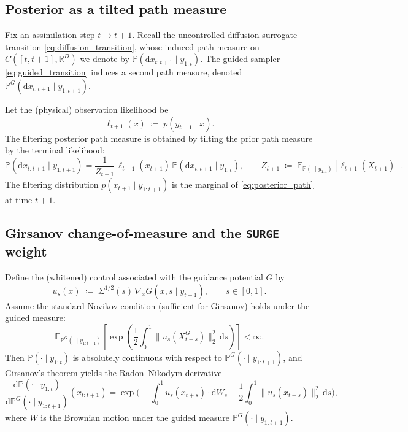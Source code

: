 \documentclass{article}
\newcommand{\E}{\mathbb{E}}
\newcommand{\dif}{{\mathrm{d}}}
\renewcommand{\P}{{\mathbb{P}}}
\newcommand{\R}{{\mathbb{R}}}
\theoremstyle{plain}
\theoremstyle{definition}
\theoremstyle{remark}
\begin{document}
\subsection{Posterior as a tilted path measure}

Fix an assimilation step $t\to t+1$. Recall the uncontrolled diffusion surrogate transition
\eqref{eq:diffusion_transition}, whose induced path measure on $C([t,t+1],\R^D)$ we denote by
$\P(\dif x_{t:t+1}\mid y_{1:t})$. The guided sampler \eqref{eq:guided_transition} induces a second path
measure, denoted $\P^G(\dif x_{t:t+1}\mid y_{1:t+1})$.

Let the (physical) observation likelihood be
\[
\ell_{t+1}(x)\;\coloneqq\;p(y_{t+1}\mid x).
\]
The filtering posterior path measure is obtained by tilting the prior path measure by the terminal
likelihood:
\begin{equation}
\label{eq:posterior_path}
\P(\dif x_{t:t+1}\mid y_{1:t+1})
=
\frac{1}{Z_{t+1}}\,
\ell_{t+1}(x_{t+1})\,
\P(\dif x_{t:t+1}\mid y_{1:t}),
\qquad
Z_{t+1}\;\coloneqq\;\E_{\P(\cdot\mid y_{1:t})}\!\left[\ell_{t+1}(X_{t+1})\right].
\end{equation}
The filtering distribution $p(x_{t+1}\mid y_{1:t+1})$ is the marginal of \eqref{eq:posterior_path} at time $t+1$.

\subsection{Girsanov change-of-measure and the \texttt{SURGE} weight}

Define the (whitened) control associated with the guidance potential $G$ by
\[
u_s(x)\;\coloneqq\;\Sigma^{1/2}(s)\,\nabla_x G(x, s\mid y_{t+1}),\qquad s\in[0,1].
\]
Assume the standard Novikov condition (sufficient for Girsanov) holds under the guided measure:
\begin{equation}
\label{eq:novikov}
\E_{\P^G(\cdot\mid y_{1:t+1})}\!\left[\exp\!\left(\frac12\int_0^1\|u_s(X_{t+s}^G)\|_2^2\,\dif s\right)\right] < \infty.
\end{equation}
Then $\P(\cdot\mid y_{1:t})$ is absolutely continuous with respect to $\P^G(\cdot\mid y_{1:t+1})$, and
Girsanov's theorem yields the Radon--Nikodym derivative
\begin{equation}
\label{eq:girsanov_rn}
\frac{\dif \P(\cdot\mid y_{1:t})}{\dif \P^G(\cdot\mid y_{1:t+1})}(x_{t:t+1})
=
\exp\!\Bigg(
-\int_0^1 u_s(x_{t+s})\cdot \dif W_s
-\frac12\int_0^1\|u_s(x_{t+s})\|_2^2\,\dif s
\Bigg),
\end{equation}
where $W$ is the Brownian motion under the guided measure $\P^G(\cdot\mid y_{1:t+1})$.
\end{document}

